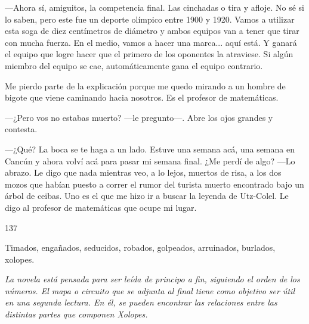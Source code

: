 \documentclass[12pt,twoside,openright,a5paper]{book}
\begin{document}
---Ahora sí, amiguitos, la competencia final. Las cinchadas o tira y afloje. No
sé si lo saben, pero este fue un deporte olímpico entre 1900 y 1920. Vamos a
utilizar esta soga de diez centímetros de diámetro y ambos equipos van a tener que tirar
con mucha fuerza. En el medio, vamos a hacer una marca... aquí está. Y ganará
el equipo que logre hacer que el primero de los oponentes la atraviese. Si
algún miembro del equipo se cae, automáticamente gana el equipo contrario.

Me pierdo parte de la explicación porque me quedo mirando a un
hombre de bigote que viene caminando hacia nosotros. Es el profesor de
matemáticas. 

---¿Pero vos no estabas muerto? ---le pregunto---. Abre los ojos
grandes y contesta. 

---¿Qué? La boca se te haga a un lado. Estuve una semana
acá, una semana en Cancún y ahora volví acá para pasar mi semana final. ¿Me
perdí de algo? ---Lo abrazo. Le digo que nada mientras veo, a lo lejos, muertos de risa,
a los dos mozos que habían puesto a correr el rumor del turista muerto
encontrado bajo un árbol de ceibas. Uno es el que me hizo ir a buscar la
leyenda de Utz-Colel. Le digo al profesor de matemáticas que ocupe mi lugar.

\vspace{0.5cm}

\hrulefill \hspace{0.1cm}\decofourleft\hspace{0.2cm} 137 \hspace{0.2cm}\decofourright \hspace{0.1cm}\hrulefill

\nopagebreak

\vspace{0.5cm}

\nopagebreak

Timados, engañados, seducidos, robados, golpeados, arruinados, burlados, xolopes.

\vspace{0.5cm}


\vspace{0.5cm}
\hrulefill\hspace{0.2cm} \decofourright\decofourleft \hspace{0.2cm} \hrulefill

\cleardoublepage



\begin{center}
\vspace*{\fill}
\emph{La novela está pensada para ser leída de principo a fin,
siguiendo el orden de los números. El mapa
o circuito que se adjunta al final tiene como objetivo ser útil
en una segunda lectura. En él, se pueden encontrar las
relaciones entre las distintas partes que componen \emph{Xolopes}.}
\vspace*{\fill}
\end{center}
\end{document}
